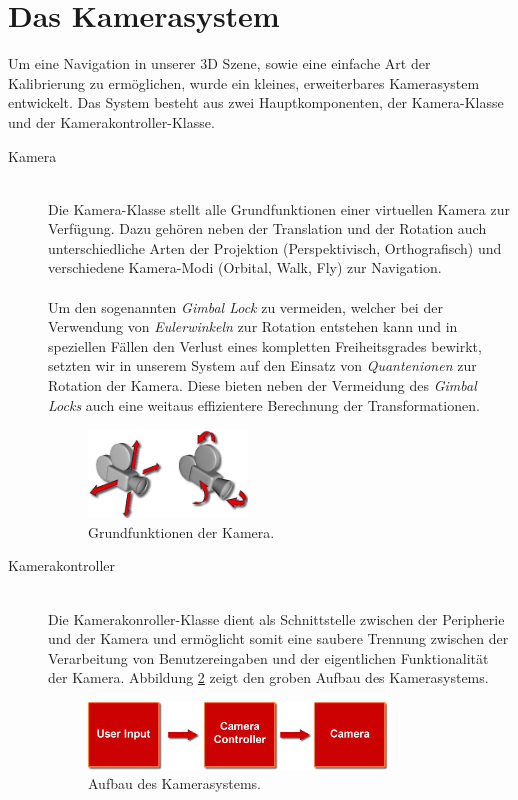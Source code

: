 \section{Das Kamerasystem}
\begin{Spacing}{\mylinespace}

Um eine Navigation in unserer 3D Szene, sowie eine einfache Art der Kalibrierung zu ermöglichen, wurde ein kleines, erweiterbares Kamerasystem entwickelt. Das System besteht aus zwei Hauptkomponenten, der Kamera-Klasse und der Kamerakontroller-Klasse.

\begin{description}
	\item[Kamera] \hfill \\
	Die Kamera-Klasse stellt alle Grundfunktionen einer virtuellen Kamera zur Verfügung. Dazu gehören neben der Translation und der Rotation auch unterschiedliche Arten der Projektion (Perspektivisch, Orthografisch) und verschiedene Kamera-Modi (Orbital, Walk, Fly) zur Navigation. \\\\
	Um den sogenannten \textit{Gimbal Lock} zu vermeiden, welcher bei der Verwendung von \textit{Eulerwinkeln} zur Rotation entstehen kann und in speziellen Fällen den Verlust eines kompletten Freiheitsgrades bewirkt, setzten wir in unserem System auf den Einsatz von \textit{Quantenionen} zur Rotation der Kamera. Diese bieten neben der Vermeidung des \textit{Gimbal Locks} auch eine weitaus effizientere Berechnung der Transformationen.   
	\begin{figure}[h!]
	\centering
	\vspace*{10px}
	\includegraphics[width=160px]{graphics/cam.png}
	\caption{Grundfunktionen der Kamera.}
	\label{fig:cam}
	\end{figure}
	\item[Kamerakontroller] \hfill \\
	Die Kamerakonroller-Klasse dient als Schnittstelle zwischen der Peripherie und der Kamera und ermöglicht somit eine saubere Trennung zwischen der Verarbeitung von Benutzereingaben und der eigentlichen Funktionalität der Kamera. Abbildung \ref{fig:Camerasystem} zeigt den groben Aufbau des Kamerasystems. 
	\begin{figure}[h!]
	\centering
	\vspace*{30px}
	\includegraphics[width=300px]{graphics/camcon.png}
	\caption{Aufbau des Kamerasystems.}
	\label{fig:Camerasystem}
	\end{figure}
\end{description}


\end{Spacing}
\newpage
\clearpage

